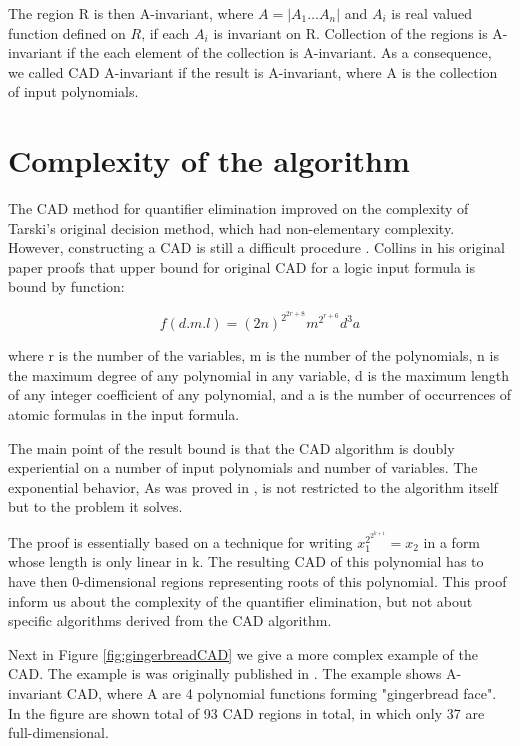 \documentclass[
  digital, %
  twoside, %
  table,   %
  nolof,     %
  nolot,     %
]{fithesis3}
\begin{document}
The region R is then A-invariant, where $A=|A_1\dots A_n|$ and $A_i$ is real valued function defined on $R$, if each $A_i$ is invariant on R.
Collection of the regions is A-invariant if the each element of the collection is A-invariant. As a consequence, we called CAD A-invariant if the result is A-invariant, where A is the collection of input polynomials.

\section{Complexity of the algorithm}
The CAD method for quantifier elimination improved on the complexity of Tarski’s original decision method, which had non-elementary complexity. However, constructing a CAD is still a difficult procedure \parencite{phdthesisWilson}. Collins in his original paper proofs that upper bound for original CAD  for a logic input formula is bound by function:

\begin{equation}
    f(d.m.l) = (2n)^{2^{2r + 8}}m^{2^{r+6}}d^3a
\end{equation}

where r is the number of the variables,  m is the number of the polynomials, n is the maximum degree of any polynomial in any variable, d is the maximum length of any integer coefficient of any polynomial, and a is the number of occurrences of atomic formulas in the input formula.\cite{10.1007/3-540-07407-4_17}

The main point of the result bound is that the CAD algorithm is doubly experiential on a number of input polynomials and number of variables. The exponential behavior, As was proved in , is not restricted to the algorithm itself but to the problem it solves. 

The proof is essentially based on a technique for writing $x^{2^{2^{k+1}}}_1 = x_2$ in a form whose length is only linear in k. The resulting CAD of this polynomial has to have then 0-dimensional regions representing roots of this polynomial. \parencite{DAVENPORT198829} This proof inform us about the complexity of the quantifier elimination, but not about specific algorithms derived from the CAD algorithm.

Next in Figure \ref{fig:gingerbreadCAD} we give a more complex example of the CAD. The example is was originally published in . The example shows A-invariant CAD, where A are 4 polynomial functions forming "gingerbread face". In the figure are shown total of 93 CAD regions in total, in which only 37 are full-dimensional.
\end{document}
